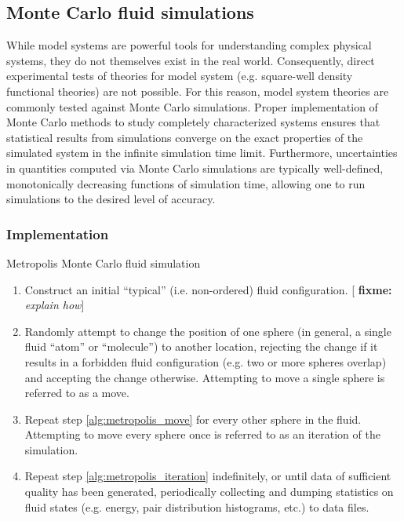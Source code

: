 \documentclass[11pt]{article}
\newenvironment{alg}
{\hrulefill\begin{enumerate}}
{\end{enumerate}\hrulefill}
\newcommand{\red}[1]{{\bf \color{red} #1}}
\newcommand{\fixme}[1]{[\red{fixme:} \emph{#1}]}
\begin{document}
\subsection{Monte Carlo fluid simulations}
\label{sec:mc_sim}

While model systems are powerful tools for understanding complex
physical systems, they do not themselves exist in the real
world. Consequently, direct experimental tests of theories for model
system (e.g. square-well density functional theories) are not
possible. For this reason, model system theories are commonly tested
against Monte Carlo simulations. Proper implementation of Monte Carlo
methods to study completely characterized systems ensures that
statistical results from simulations converge on the exact properties
of the simulated system in the infinite simulation time
limit. Furthermore, uncertainties in quantities computed via Monte
Carlo simulations are typically well-defined, monotonically decreasing
functions of simulation time, allowing one to run simulations to the
desired level of accuracy.

\subsubsection{Implementation}
\label{sec:mc_implementation}

\begin{algorithm}[tb]
  \caption{Metropolis Monte Carlo fluid simulation}
  \label{alg:metropolis}
  \begin{alg}

  \item Construct an initial ``typical'' (i.e. non-ordered) fluid
    configuration. \fixme{explain how}

  \item Randomly attempt to change the position of one sphere (in
    general, a single fluid ``atom'' or ``molecule'') to another
    location, rejecting the change if it results in a forbidden fluid
    configuration (e.g. two or more spheres overlap) and accepting the
    change otherwise. Attempting to move a single sphere is referred
    to as a move. \label{alg:metropolis_move}

  \item Repeat step \ref{alg:metropolis_move} for every other sphere
    in the fluid. Attempting to move every sphere once is referred to
    as an iteration of the simulation.
    \label{alg:metropolis_iteration}

  \item Repeat step \ref{alg:metropolis_iteration} indefinitely, or
    until data of sufficient quality has been generated, periodically
    collecting and dumping statistics on fluid states (e.g. energy,
    pair distribution histograms, etc.) to data files.

  \end{alg}
\end{algorithm}
\end{document}
